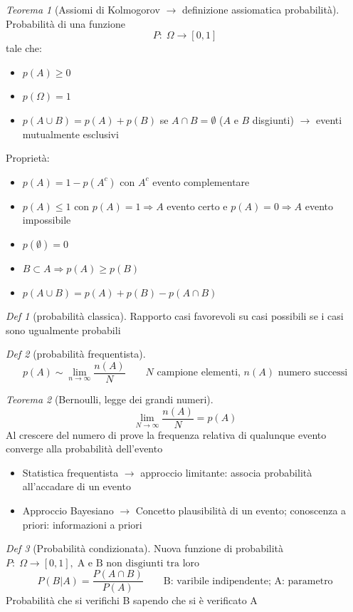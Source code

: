 \documentclass[12pt]{report}
\theoremstyle{remark}
\theoremstyle{theorem}
\newtheorem*{teo}{Teorema}
\newtheorem*{Def}{Def}
\begin{document}
\begin{teo}[Assiomi di Kolmogorov $\rightarrow$ definizione assiomatica probabilità]\label{p_assiomatica}
	Probabilità di una funzione
	\[P: \; \Omega\to [0,1]\]
	tale che:
	\begin{itemize}
		\item $p(A) \ge 0$
		\item $p(\Omega) = 1$
		\item $p(A\cup B)=p(A)+p(B)$ se $A\cap B = \emptyset$ ($A$ e $B$ disgiunti) $\to$ eventi mutualmente esclusivi  
	\end{itemize}	
	Proprietà:
	\begin{itemize}
		\item $p(A) = 1- p(A^c)$ con $A^c$ evento complementare
		\item $p(A) \le 1$ con $p(A) = 1 \Rightarrow A $ evento certo e $p(A)=0 \Rightarrow A$ evento impossibile
		\item $p(\emptyset)=0$
		\item $B \subset A \Rightarrow p(A) \ge p(B)$
		\item $p(A\cup B) = p(A)+p(B)-p(A\cap B)$
	\end{itemize}
\end{teo}

\begin{Def}[probabilità classica]\label{p_classica}
	Rapporto casi favorevoli su casi possibili se i  casi sono ugualmente probabili
\end{Def}
\begin{Def}[probabilità frequentista]\label{p_frequentista}
	\[p(A)\sim \lim_{n\to\infty} \frac{n(A)}{N} \qquad N \text{ campione elementi, } n(A) \text{ numero successi}\]
\end{Def}
\begin{teo}[Bernoulli, legge dei grandi numeri]\label{teo:bernoulli}
	\[\lim_{N\to\infty} \frac{n(A)}{N} = p(A)\]
	Al crescere del numero di prove la frequenza relativa di 
	qualunque evento converge alla probabilità dell'evento
	\begin{itemize}
		\item Statistica frequentista $\to$ approccio limitante: associa probabilità all'accadare di un evento
		\item Approccio Bayesiano $\to$ Concetto plausibilità di un evento; conoscenza a priori: informazioni a priori
	\end{itemize}
\end{teo}

\begin{Def}[Probabilità condizionata]
	Nuova funzione di probabilità \qquad
	$P: \; \Omega \to [0,1], \; \text{A e B non disgiunti tra loro}$
	\[P(B|A) = {\frac{P(A \cap B)}{P(A)}} \qquad \text{B: varibile indipendente; A: parametro}\]
	Probabilità che si verifichi B sapendo che si è verificato A
\end{Def}
\end{document}
